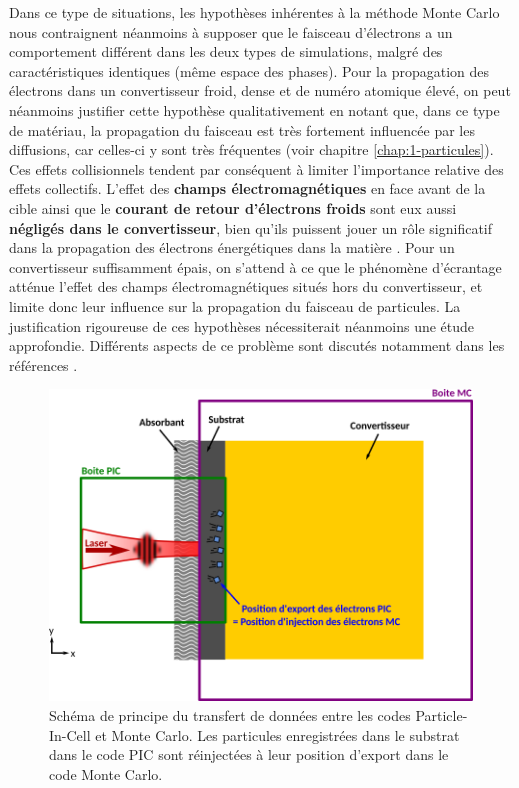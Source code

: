 \begin{refsection}
\newpage 

Dans ce type de situations, les hypothèses inhérentes à la méthode Monte Carlo nous contraignent néanmoins à supposer que le faisceau d'électrons a un comportement différent dans les deux types de simulations, malgré des caractéristiques identiques (même espace des phases). Pour la propagation des électrons dans un convertisseur froid, dense et de numéro atomique élevé, on peut néanmoins justifier cette hypothèse qualitativement en notant que, dans ce type de matériau, la propagation du faisceau est très fortement influencée par les diffusions, car celles-ci y sont très fréquentes (voir chapitre \ref{chap:1-particules}). Ces effets collisionnels tendent par conséquent à limiter l'importance relative des effets collectifs.
L'effet des \textbf{champs électromagnétiques} en face avant de la cible ainsi que le \textbf{courant de retour d'électrons froids} sont eux aussi \textbf{négligés dans le convertisseur}, bien qu'ils puissent jouer un rôle significatif dans la propagation des électrons énergétiques dans la matière \parencite{davies_1997, compantlafontaine_2018}. Pour un convertisseur suffisamment épais, on s'attend à ce que le phénomène d'écrantage atténue l'effet des champs électromagnétiques situés hors du convertisseur, et limite donc leur influence sur la propagation du faisceau de particules. La justification rigoureuse de ces hypothèses nécessiterait néanmoins une étude approfondie. Différents aspects de ce problème sont discutés notamment dans les références \parencite{davies_2002, tikhonchuk_2002, davies_1997, compantlafontaine_2018}. 

\begin{figure}[hbtp]
	\centering
	\includegraphics[width=0.7\linewidth]{4-simulation/transition_PIC_MC.png}
	\caption{Schéma de principe du transfert de données entre les codes Particle-In-Cell et Monte Carlo. Les particules enregistrées dans le substrat dans le code PIC sont réinjectées à leur position d'export dans le code Monte Carlo.}
	\label{fig:4-MC_PIC_transition}
\end{figure}


\end{refsection}
